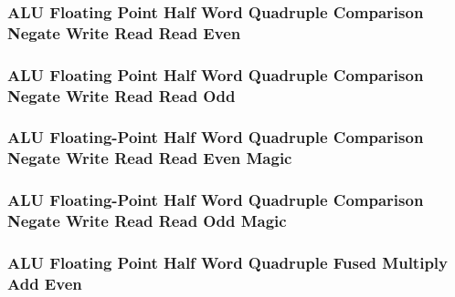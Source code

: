 

\subsubsection[{\small ALU Floating Point Half Word Quadruple Comparison Negate Write Read Read Even}]{ALU Floating Point Half Word Quadruple Comparison Negate Write Read Read Even} \label{sec:format-ALU-FHQCNWRRE}



\subsubsection[{\small ALU Floating Point Half Word Quadruple Comparison Negate Write Read Read Odd}]{ALU Floating Point Half Word Quadruple Comparison Negate Write Read Read Odd} \label{sec:format-ALU-FHQCNWRRO}



\subsubsection[{\small ALU Floating-Point Half Word Quadruple Comparison Negate Write Read Read Even Magic}]{ALU Floating-Point Half Word Quadruple Comparison Negate Write Read Read Even Magic} \label{sec:format-ALU-FHQCNWRRE.M}



\subsubsection[{\small ALU Floating-Point Half Word Quadruple Comparison Negate Write Read Read Odd Magic}]{ALU Floating-Point Half Word Quadruple Comparison Negate Write Read Read Odd Magic} \label{sec:format-ALU-FHQCNWRRO.M}



\subsubsection[{\small ALU Floating Point Half Word Quadruple Fused Multiply Add Even}]{ALU Floating Point Half Word Quadruple Fused Multiply Add Even} \label{sec:format-ALU-FHQFMAE}

